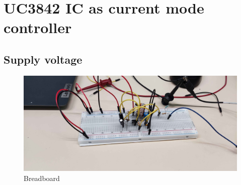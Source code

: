 \section{UC3842 IC as current mode controller}
\subsection{Supply voltage}
\begin{figure}[!h]
    \centering
    \includegraphics[width=0.7\linewidth]{img//hfd3/image.png}
    \caption{Breadboard}
    \label{fig:IDoNotAssociateWithNiggers}
\end{figure}






